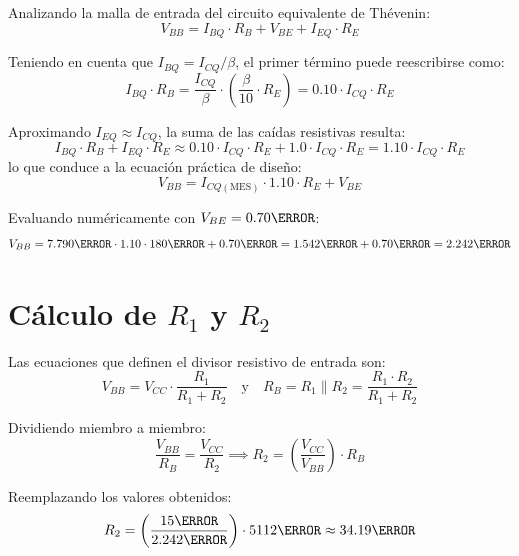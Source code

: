 Analizando la malla de entrada del circuito equivalente de Thévenin:
\begin{equation}
  V_{BB} = I_{BQ} \cdot R_B + V_{BE} + I_{EQ} \cdot R_E
  \label{eq:malla_entrada}
\end{equation}

Teniendo en cuenta que $I_{BQ} = I_{CQ}/\beta$, el primer término puede reescribirse como:
\begin{equation}
  I_{BQ} \cdot R_B = \frac{I_{CQ}}{\beta} \cdot \left(\frac{\beta}{10} \cdot R_E\right) = 0.10 \cdot I_{CQ} \cdot R_E
\end{equation}

Aproximando $I_{EQ} \approx I_{CQ}$, la suma de las caídas resistivas resulta:
\begin{equation}
  I_{BQ} \cdot R_B + I_{EQ} \cdot R_E \approx 0.10 \cdot I_{CQ} \cdot R_E + 1.0 \cdot I_{CQ} \cdot R_E = 1.10 \cdot I_{CQ} \cdot R_E
\end{equation}
lo que conduce a la ecuación práctica de diseño:
\begin{equation}
  V_{BB} = I_{CQ(\text{MES})} \cdot 1.10 \cdot R_E + V_{BE}
  \label{eq:Vbb_formula}
\end{equation}

Evaluando numéricamente con $V_{BE} = 0.70\V$:
\begin{equation}
  V_{BB} = 7.790\mA \cdot 1.10 \cdot 180\ohm + 0.70\V = 1.542\V + 0.70\V = 2.242\V
  \label{eq:Vbb_calculada}
\end{equation}

\section{Cálculo de $R_1$ y $R_2$}

Las ecuaciones que definen el divisor resistivo de entrada son:
\begin{equation}
  V_{BB} = V_{CC} \cdot \frac{R_1}{R_1 + R_2} \quad \text{y} \quad R_B = R_1 \parallel R_2 = \frac{R_1 \cdot R_2}{R_1 + R_2}
\end{equation}

Dividiendo miembro a miembro:
\begin{equation}
  \frac{V_{BB}}{R_B} = \frac{V_{CC}}{R_2} \implies R_2 = \left(\frac{V_{CC}}{V_{BB}}\right) \cdot R_B
  \label{eq:R2_formula}
\end{equation}

Reemplazando los valores obtenidos:
\begin{equation}
  R_2 = \left(\frac{15\V}{2.242\V}\right) \cdot 5112\ohm \approx 34.19\kohm
  \label{eq:R2_teorica}
\end{equation}

